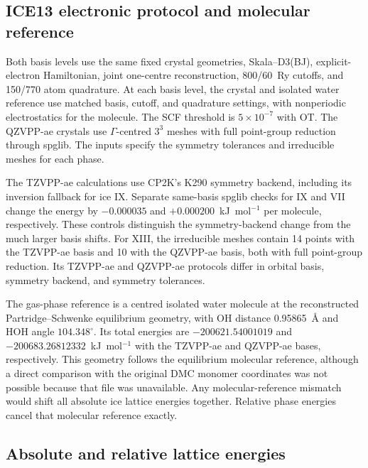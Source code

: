 \documentclass[10pt,a4paper]{article}
\begin{document}
\subsection{ICE13 electronic protocol and molecular reference}
\label{sec:ice-protocol}

Both basis levels use the same fixed crystal geometries, Skala--D3(BJ), explicit-electron Hamiltonian, joint one-centre reconstruction, 800/60~Ry cutoffs, and 150/770 atom quadrature. At each basis level, the crystal and isolated water reference use matched basis, cutoff, and quadrature settings, with nonperiodic electrostatics for the molecule. The SCF threshold is $5\times10^{-7}$ with OT. The QZVPP-ae crystals use $\Gamma$-centred $3^3$ meshes with full point-group reduction through spglib.\cite{Togo2024Spglib} The inputs specify the symmetry tolerances and irreducible meshes for each phase.

The TZVPP-ae calculations use CP2K's K290 symmetry backend, including its inversion fallback for ice IX. Separate same-basis spglib checks for IX and VII change the energy by $-0.000035$ and $+0.000200$~kJ~mol$^{-1}$ per molecule, respectively. These controls distinguish the symmetry-backend change from the much larger basis shifts. For XIII, the irreducible meshes contain 14 points with the TZVPP-ae basis and 10 with the QZVPP-ae basis, both with full point-group reduction. Its TZVPP-ae and QZVPP-ae protocols differ in orbital basis, symmetry backend, and symmetry tolerances.

The gas-phase reference is a centred isolated water molecule at the reconstructed Partridge--Schwenke equilibrium geometry, with OH distance 0.95865~\AA{} and HOH angle $104.348^\circ$.\cite{Gillan2012WaterClusters} Its total energies are $-200621.54001019$ and $-200683.26812332$~kJ~mol$^{-1}$ with the TZVPP-ae and QZVPP-ae bases, respectively. This geometry follows the equilibrium molecular reference, although a direct comparison with the original DMC monomer coordinates was not possible because that file was unavailable. Any molecular-reference mismatch would shift all absolute ice lattice energies together. Relative phase energies cancel that molecular reference exactly.


\subsection{Absolute and relative lattice energies}
\label{sec:ice-results}
\end{document}
